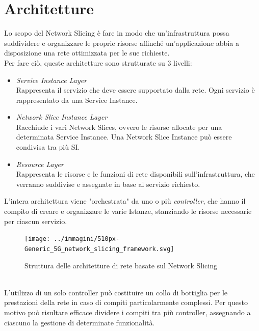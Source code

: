 \section{Architetture}\label{ch:1.2}
Lo scopo del Network Slicing è fare in modo che un'infrastruttura possa suddividere e organizzare le proprie risorse affinché un'applicazione abbia a disposizione una rete ottimizzata per le sue richieste.\\
Per fare ciò, queste architetture sono strutturate su 3 livelli:
\begin{itemize}
	
	\item \textit{Service Instance Layer}\\
	Rappresenta il servizio che deve essere supportato dalla rete. Ogni servizio è rappresentato da una Service Instance.
	
	\item \textit{Network Slice Instance Layer}\\
	Racchiude i vari Network Slices, ovvero le risorse allocate per una determinata Service Instance. Una Network Slice Instance può essere condivisa tra più SI.
	
	\item \textit{Resource Layer}\\
	Rappresenta le risorse e le funzioni di rete disponibili sull'infrastruttura, che verranno suddivise e assegnate in base al servizio richiesto.
	
	
\end{itemize}
L'intera architettura viene "orchestrata" da uno o più \textit{controller}, che hanno il compito di creare e organizzare le varie Istanze, stanziando le risorse necessarie per ciascun servizio.
\cite{NSintro}
\begin{figure}
	\centering
	\texttt{[image: ../immagini/510px-Generic\_5G\_network\_slicing\_framework.svg]}
	\caption[Architettura Network Slicing]{Struttura delle architetture di rete basate sul Network Slicing}
	\label{fig:510px-generic5gnetworkslicingframework}
\end{figure}\\
L'utilizzo di un solo controller può costituire un collo di bottiglia per le prestazioni della rete in caso di compiti particolarmente complessi. Per questo motivo può risultare efficace dividere i compiti tra più controller, assegnando a ciascuno la gestione di determinate funzionalità.
